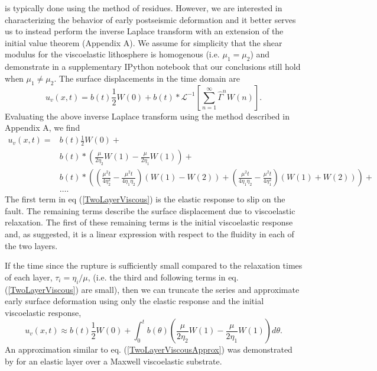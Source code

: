 \documentclass[extra,mreferee]{gji}
\begin{document}
is typically done using the method of residues. However, we are interested in characterizing
the behavior of early postseismic deformation and it better serves us
to instead perform the inverse Laplace transform with an extension of
the initial value theorem (Appendix A). We assume for simplicity that
the shear modulus for the viscoelastic lithosphere is homogenous
(i.e. $\mu_1 = \mu_2$) and demonstrate in a supplementary IPython
notebook that our conclusions still hold when $\mu_1 \neq \mu_2$.  The
surface displacements in the time domain are
\begin{equation}
 u_v(x,t) = b(t)\frac{1}{2}W(0) + 
            b(t)\ast\mathcal{L}^{-1}\left[\sum_{n=1}^\infty\hat{\Gamma}^{n}W(n)\right].
\end{equation}
Evaluating the above inverse Laplace transform using the method
described in Appendix A, we find 
\begin{align}\label{TwoLayerViscous}
  u_v(x,t) = &b(t)\frac{1}{2}W(0) +\nonumber\\
             &b(t)\ast\left(\frac{\mu}{2\eta_2}W(1) - \frac{\mu}{2\eta_1}W(1)\right) +\nonumber\\
             &b(t)\ast\left(\left(\frac{\mu^2t}{4\eta_2^2} -
                  \frac{\mu^2t}{4\eta_1\eta_2}\right) \left(W(1) - W(2)\right) +
                  \left(\frac{\mu^2t}{4\eta_1\eta_2} - \frac{\mu^2t}{4\eta_1^2}\right)
                  \left(W(1) + W(2)\right)\right) + \nonumber\\ 
             &\dots.
\end{align}
The first term in eq (\ref{TwoLayerViscous}) is the elastic response
to slip on the fault.  The remaining terms describe the surface
displacement due to viscoelastic relaxation.  The first of these
remaining terms is the initial viscoelastic response and, as
suggested, it is a linear expression with respect to the fluidity in
each of the two layers.

If the time since the rupture is sufficiently small compared to the
relaxation times of each layer, $\tau_i=\eta_i/\mu$, (i.e. the third
and following terms in eq. (\ref{TwoLayerViscous}) are small), then we
can truncate the series and approximate early surface deformation
using only the elastic response and the initial viscoelastic response,
\begin{equation}\label{TwoLayerViscousApprox}
 u_v(x,t) \approx b(t)\frac{1}{2}W(0) + 
          \int_0^t b(\theta)\left(\frac{\mu}{2\eta_2}W(1) - 
                  \frac{\mu}{2\eta_1}W(1)\right)d\theta.
\end{equation} 
An approximation similar to eq. (\ref{TwoLayerViscousApprox}) was
demonstrated by \citet{S2010} for an elastic layer over a Maxwell
viscoelastic substrate.  
\end{document}
